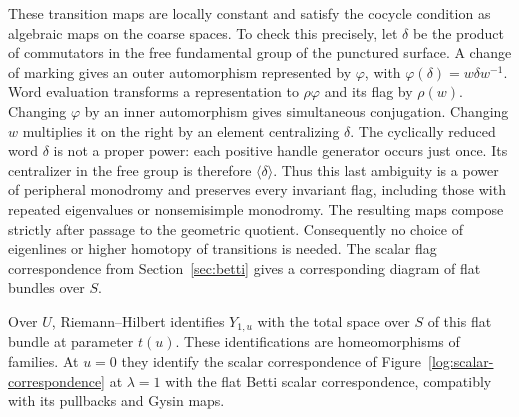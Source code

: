 These transition maps are locally constant and satisfy the cocycle
condition as algebraic maps on the coarse spaces.  To check this
precisely, let $\delta$ be the product of commutators in the free
fundamental group of the punctured surface.  A change of marking
gives an outer automorphism represented by $\varphi$, with
$\varphi(\delta)=w\delta w^{-1}$.  Word evaluation transforms a
representation to $\rho\varphi$ and its flag by $\rho(w)$.
Changing $\varphi$ by an inner automorphism gives simultaneous
conjugation.  Changing $w$ multiplies it on the right by an element
centralizing $\delta$.  The cyclically reduced word $\delta$ is not
a proper power: each positive handle generator occurs just once.
Its centralizer in the free group is therefore $\langle\delta\rangle$.
Thus this last ambiguity is a power of peripheral monodromy and
preserves every invariant flag, including those with repeated
eigenvalues or nonsemisimple monodromy.  The resulting maps compose
strictly after passage to the geometric quotient.  Consequently no
choice of eigenlines or higher homotopy of transitions is needed.
The scalar flag correspondence from
Section~\ref{sec:betti} gives a corresponding diagram of flat bundles
over $S$.

\begin{proposition}
\label{log:rh}
Over $U$, Riemann--Hilbert identifies $Y_{1,u}$ with the total space
over $S$ of this flat bundle at parameter $t(u)$.  These identifications
are homeomorphisms of families.  At $u=0$ they identify the scalar
correspondence of Figure~\ref{log:scalar-correspondence} at $\lambda=1$ with
the flat Betti scalar correspondence, compatibly with its pullbacks
and Gysin maps.
\end{proposition}

